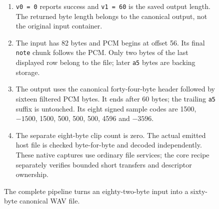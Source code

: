 \begin{figure}[htbp]
\begin{minipage}{\linewidth}
\begin{enumerate}
      \item \texttt{v0 = 0} reports success and \texttt{v1 = 60} is the saved output length. The returned byte length belongs to the canonical output, not the original input container.
      \item The input has 82 bytes and PCM begins at offset 56. Its final \texttt{note} chunk follows the PCM. Only two bytes of the last displayed row belong to the file; later \texttt{a5} bytes are backing storage.
      \item The output uses the canonical forty-four-byte header followed by sixteen filtered PCM bytes. It ends after 60 bytes; the trailing \texttt{a5} suffix is untouched. Its eight signed sample codes are 1500, $-1500$, 1500, 500, 500, 500, 4596 and $-3596$.
      \item The separate eight-byte clip count is zero. The actual emitted host file is checked byte-for-byte and decoded independently. These native captures use ordinary file services; the core recipe separately verifies bounded short transfers and descriptor ownership.
    \end{enumerate}
  \end{minipage}
  \caption{The complete pipeline turns an eighty-two-byte input into a sixty-byte canonical WAV file.}
  \label{capture:031-pcm-wav-f05}
  \label{pcm-wav-f05}
\end{figure}
\par
